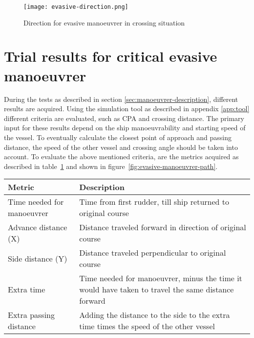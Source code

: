 \begin{figure}[p]
	\centering
	\texttt{[image: evasive-direction.png]}
	\caption{Direction for evasive manoeuvrer in crossing situation}
	\label{fig:evasive-direction} 
\end{figure}



\clearpage

\section{Trial results for critical evasive manoeuvrer}
During the tests as described in section \ref{sec:manoeuvrer-description}, different results are acquired. Using the simulation tool as described in appendix \ref{app:tool} different criteria are evaluated, such as CPA and crossing distance. The primary input for these results depend on the ship manoeuvrability and starting speed of the vessel. To eventually calculate the closest point of approach and passing distance, the speed of the other vessel and crossing angle should be taken into account. To evaluate the above mentioned criteria, are the metrics acquired as described in table~\ref{tab:evasive-manoeuvrer-metrics} and shown in figure~\ref{fig:evasive-manoeuvrer-path}.

\begin{table}[H]
	\begin{tabular}{p{}|p{}}
		\toprule
		Metric & Description\\
		\midrule
		Time needed for manoeuvrer & Time from first rudder, till ship returned to original course \\
		Advance distance (X) & Distance traveled forward in direction of original course \\
		Side distance (Y) & Distance traveled perpendicular to original course\\
		Extra time & Time needed for manoeuvrer, minus the time it would have taken to travel the same distance forward \\
		Extra passing distance & Adding the distance to the side to the extra time times the speed of the other vessel \\
		\bottomrule
	\end{tabular}
	
	\label{tab:evasive-manoeuvrer-metrics}
\end{table}

